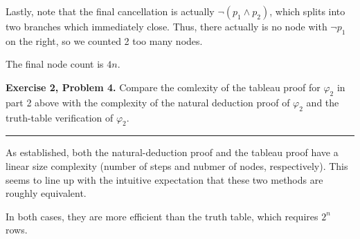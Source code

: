 \documentclass{article}
\newcommand*{\Break}{\vspace{0.2cm}\hrule{}\vspace{0.2cm}}
\begin{document}
Lastly, note that the final cancellation is actually $\lnot(p_1 \wedge p_2)$,
which splits into two branches which immediately close. Thus, there actually
is no node with $\lnot p_1$ on the right, so we counted 2 too many nodes.

The final node count is $4n$.

\newpage{}

\noindent\textbf{Exercise 2, Problem 4.} Compare the comlexity of the tableau
proof for $\varphi_2$ in part 2 above with the complexity of the natural
deduction proof of $\varphi_2$ and the truth-table verification of $\varphi_2$.

\Break{}

As established, both the natural-deduction proof and the tableau proof have
a linear size complexity (number of steps and nubmer of nodes, respectively).
This seems to line up with the intuitive expectation that these two methods
are roughly equivalent.

In both cases, they are more efficient than the truth table, which requires
$2^n$ rows.
\end{document}
